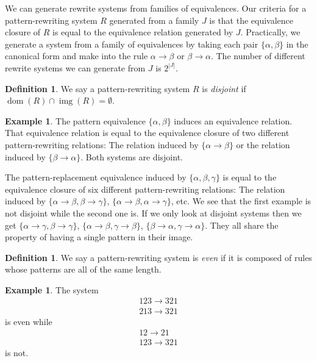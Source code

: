 \documentclass[a4paper, 11pt, english]{article}
\newcommand{\patternrule}{ \to \!}
\theoremstyle{definition}
\newtheorem{definition}[theorem]{Definition}
\newtheorem{example}[theorem]{Example}
\DeclareMathOperator{\dom}{dom}
\DeclareMathOperator{\img}{img}
\begin{document}
We can generate rewrite systems from families of equivalences. Our criteria for a pattern-rewriting
system $R$ generated from a family $J$ is that the equivalence closure of $R$ is equal to the
equivalence relation generated by $J$. 
Practically, we generate a system from a family of equivalences by taking each pair $\{\alpha, \beta
\}$ in the canonical form and make into the rule $\alpha \patternrule \beta$ or $\beta \patternrule
\alpha$. The number of different rewrite systems we can generate from $J$ is $2^{|J|}$.

\begin{definition}
  We say a pattern-rewriting system $R$ is \emph{disjoint} if $\dom(R) \cap \img(R) = \emptyset$.
\end{definition}

\begin{example}
  The pattern equivalence $\{ \alpha, \beta \}$ induces an equivalence relation.
  That equivalence relation is equal to the equivalence closure of two different pattern-rewriting
  relations: The relation induced by $\{ \alpha \patternrule \beta \}$ or the relation induced by
  $\{ \beta \patternrule \alpha \}$. Both systems are disjoint.

  The pattern-replacement equivalence induced by $\{ \alpha, \beta, \gamma \}$ is
  equal to the equivalence closure of six different pattern-rewriting
  relations: The relation induced by $\{ \alpha \patternrule \beta, \beta \patternrule \gamma \}$,
  $\{ \alpha \patternrule \beta, \alpha \patternrule \gamma \}$, etc. We see that the first example is
  not disjoint while the second one is. If we only look at disjoint systems then we get
  $\{ \alpha \patternrule \gamma, \beta \patternrule \gamma \}$,
  $\{ \alpha \patternrule \beta, \gamma \patternrule \beta \}$,
  $\{ \beta \patternrule \alpha, \gamma \patternrule \alpha \}$.
  They all share the property of having a single pattern in their image.
\end{example}

\begin{definition}
  We say a pattern-rewriting system is \emph{even} if it is composed of rules whose patterns are all
  of the same length.
\end{definition}

\begin{example}
  The system
  \begin{gather*}
    123 \patternrule 321 \\
    213 \patternrule 321
  \end{gather*}
  is even while
  \begin{gather*}
    12 \patternrule 21 \\
    123 \patternrule 321 
  \end{gather*}
  is not.
\end{example}
\end{document}
